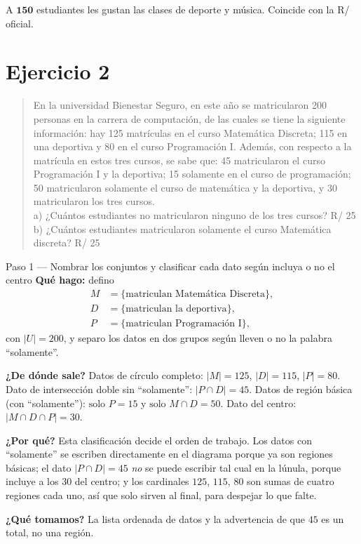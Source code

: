 \documentclass[11pt]{article}
\begin{document}
\begin{resp}
A $\mathbf{150}$ estudiantes les gustan las clases de deporte y música. Coincide con la R/ oficial.
\end{resp}

\section*{Ejercicio 2}

\begin{quote}
En la universidad Bienestar Seguro, en este año se matricularon 200 personas en la carrera de
computación, de las cuales se tiene la siguiente información: hay 125 matrículas en el curso Matemática
Discreta; 115 en una deportiva y 80 en el curso Programación I. Además, con respecto a la matrícula en
estos tres cursos, se sabe que: 45 matricularon el curso Programación I y la deportiva; 15 solamente en
el curso de programación; 50 matricularon solamente el curso de matemática y la deportiva, y 30
matricularon los tres cursos.\\
a) ¿Cuántos estudiantes no matricularon ninguno de los tres cursos? \hfill R/ 25\\
b) ¿Cuántos estudiantes matricularon solamente el curso Matemática discreta? \hfill R/ 25
\end{quote}

\begin{paso}{Paso 1 --- Nombrar los conjuntos y clasificar cada dato según incluya o no el centro}
\textbf{Qué hago:} defino
\[
\begin{aligned}
M&=\{\text{matriculan Matemática Discreta}\},\\
D&=\{\text{matriculan la deportiva}\},\\
P&=\{\text{matriculan Programación I}\},
\end{aligned}
\]
con $|U|=200$, y separo los datos en dos grupos según lleven o no la palabra ``solamente''.

\textbf{¿De dónde sale?} Datos de círculo completo: $|M|=125$, $|D|=115$, $|P|=80$. Dato de
intersección doble sin ``solamente'': $|P\cap D|=45$. Datos de región básica (con ``solamente''):
$\text{solo }P=15$ y $\text{solo }M\cap D=50$. Dato del centro: $|M\cap D\cap P|=30$.

\textbf{¿Por qué?} Esta clasificación decide el orden de trabajo. Los datos con ``solamente'' se escriben
directamente en el diagrama porque ya son regiones básicas; el dato $|P\cap D|=45$ \emph{no} se puede
escribir tal cual en la lúnula, porque incluye a los 30 del centro; y los cardinales $125$, $115$, $80$
son sumas de cuatro regiones cada uno, así que solo sirven al final, para despejar lo que falte.

\textbf{¿Qué tomamos?} La lista ordenada de datos y la advertencia de que $45$ es un total, no una región.
\end{paso}
\end{document}
